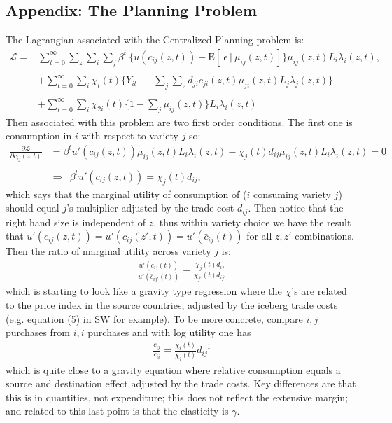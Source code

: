 \documentclass[12pt,pdftex]{article}
\begin{document}
\begin{onehalfspacing}
\section{Appendix: The Planning Problem}
The Lagrangian associated with the Centralized Planning problem is:
\begin{align}
\mathcal{L}  = & \sum_{t=0}^{\infty}  \sum\limits_{z} \sum_{i} \sum_{j} \beta^{t} \  \bigg \{  u(c_{ij}(z, t) ) + \mathrm{E}[ \ \epsilon \ | \ \mu_{ij}(z,t) ] \bigg \}\mu_{ij}(z,t) L_{i} \lambda_{i}(z, t), \\
\nonumber \\
&+ \sum_{t=0}^{\infty} \sum_{i} \chi_{i}(t) \bigg \{ Y_{it} \  - \ \sum_{j} \sum_{z} d_{ji} c_{ji}(z, t) \mu_{ji}(z,t) L_{j}\lambda_{j}(z, t) \bigg \} \nonumber \\
\nonumber \\
&+ \sum_{t=0}^{\infty} \sum_{i} \chi_{2i}(t) \bigg \{1 - \sum_{j}\mu_{ij}(z,t) \bigg \} L_{i} \lambda_{i}(z, t) \nonumber
\label{eq:pp}
\end{align}
Then associated with this problem are two first order conditions. The first one is consumption in $i$ with respect to variety $j$ so:
\begin{align}
\frac{\partial \mathcal{L} }{\partial c_{ij}(z, t)} &=  \beta^{t} u'(c_{ij}(z, t)) \mu_{ij}(z,t) L_{i} \lambda_{i}(z, t) - \chi_{j}(t) d_{ij} \mu_{ij}(z,t) L_{i} \lambda_{i}(z, t) = 0 \\
\nonumber \\
& \Rightarrow \ \ \beta^{t} u'(c_{ij}(z, t) ) = \chi_{j}(t) d_{ij},
\end{align}
which says that the marginal utility of consumption of ($i$ consuming variety $j$) should equal $j$'s multiplier adjusted by the trade cost $d_{ij}$. Then notice that the right hand size is independent of $z$, thus within variety choice we have the result that $u'(c_{ij}(z, t)) = u'(c_{ij}(z', t)) = u'(\bar c_{ij}(t))$ for all $z, z'$ combinations. Then the ratio of marginal utility across variety $j$ is:
\begin{align}
\frac{u'(\bar c_{ij}(t))}{u'(\bar c_{ij'}(t))} = \frac{\chi_{j}(t) d_{ij}}{\chi_{j'}(t) d_{ij'}}
\end{align}
which is starting to look like a gravity type regression where the $\chi$'s are related to the price index in the source countries, adjusted by the iceberg trade costs (e.g. equation (5) in SW for example). To be more concrete, compare $i,j$ purchases from $i,i$ purchases and with log utility one has
\begin{align}
\frac{\bar c_{ij} }{ \bar c_{ii}} = \frac{\chi_{i}(t)}{\chi_{j}(t)}d_{ij}^{-1}
\end{align}
which is quite close to a gravity equation where relative consumption equals a source and destination effect adjusted by the trade costs. Key differences are that this is in quantities, not expenditure; this does not reflect the extensive margin; and related to this last point is that the elasticity is $\gamma$.


\end{onehalfspacing}
\end{document}
